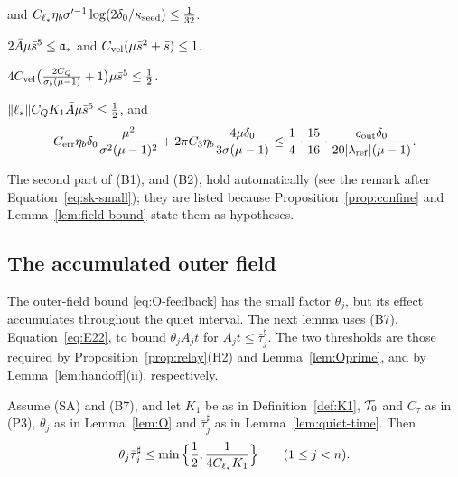 \begin{definition}
\begin{description}[font=\normalfont]
\[  \]
  and $C_{\ell_*}\eta_b\sigma'^{-1}\log(2\delta_0/\kappa_{\mathrm{seed}})\le\frac1{32}$.
\item[\textup{(B9)}] $2\bar A\mu\bar s^5\le\mathfrak{a}_*$ and $C_{\mathrm{vel}} (\mu\bar s^2+\bar s)\le1$.
\item[\textup{(B10)}] $4C_{\mathrm{vel}} \big(\frac{2C_Q}{\sigma_\flat(\mu-1)}+1\big)\mu\bar s^5\le\frac12$.
\item[\textup{(B11)}] $\|\ell_*\|C_QK_1\bar A\mu\bar s^5\le\frac12$, and
  \[
  C_{\mathrm{err}}\eta_b\delta_0\frac{\mu^2}{\sigma^2(\mu-1)^2}+2\pi C_3\eta_b\frac{4\mu\delta_0}{3\sigma(\mu-1)}
  \le\frac14\cdot\frac{15}{16}\cdot\frac{c_{\mathrm{out}}\delta_0}{20|\lambda_{\mathrm{ref}}|(\mu-1)} .
  \]
\end{description}
\end{definition}

The second part of (B1), and (B2), hold automatically (see the remark after
Equation~\eqref{eq:sk-small}); they are listed because Proposition~\ref{prop:confine} and
Lemma~\ref{lem:field-bound} state them as hypotheses.

\subsection{The accumulated outer field}
\label{sec:param-feedback}

The outer-field bound \eqref{eq:O-feedback} has the small factor $\theta_j$,
but its effect accumulates throughout the quiet interval. The next lemma
uses (B7), Equation~\eqref{eq:E22}, to bound $\theta_jA_jt$ for
$A_jt\le\bar\tau^\sharp_j$. The two thresholds are those required by
Proposition~\ref{prop:relay}\textup{(H2)} and Lemma~\ref{lem:Oprime}, and by
Lemma~\ref{lem:handoff}\textup{(ii)}, respectively.

\begin{lemma}
\label{lem:theta-quiet}
Assume (SA) and \textup{(B7)}, and let $K_1$ be as in Definition~\ref{def:K1},
$\mathcal{T}_0$ and $C_\tau$ as in \textup{(P3)}, $\theta_j$ as in Lemma~\ref{lem:O} and
$\bar\tau^\sharp_j$ as in Lemma~\ref{lem:quiet-time}. Then
\begin{equation}
\label{eq:theta-quiet}
\theta_j\bar\tau^\sharp_j\le\min\Big\{\frac12,\frac1{4C_{\ell_*} K_1}\Big\}
\qquad(1\le j<n).
\end{equation}
\end{lemma}

